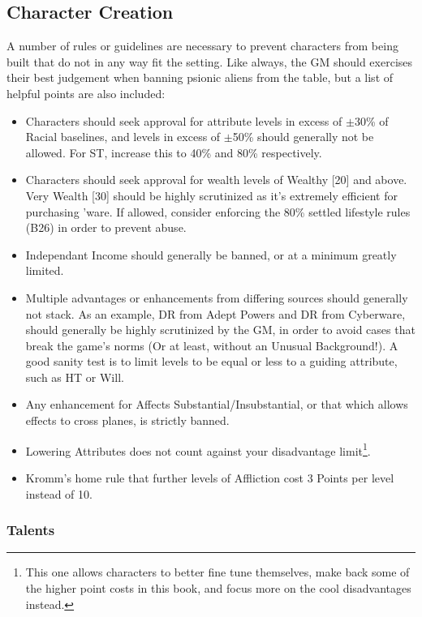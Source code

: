 \begin{multicols*}{3}
	\subsection{Character Creation}
	
	A number of rules or guidelines are necessary to prevent characters from being built that do not in any way fit the setting. Like always, the GM should exercises their best judgement when banning psionic aliens from the table, but a list of helpful points are also included:
	
	\begin{itemize}
		\itemsep 0pt
		\item Characters should seek approval for attribute levels in excess of \(\pm\)30\% of Racial baselines, and levels in excess of \(\pm\)50\% should generally not be allowed. For ST, increase this to 40\% and 80\% respectively.
		\item Characters should seek approval for wealth levels of Wealthy [20] and above. Very Wealth [30] should be highly scrutinized as it's extremely efficient for purchasing 'ware. If allowed, consider enforcing the 80\% settled lifestyle rules (B26) in order to prevent abuse.
		\item Independant Income should generally be banned, or at a minimum greatly limited.
		\item Multiple advantages or enhancements from differing sources should generally not stack. As an example, DR from Adept Powers and DR from Cyberware, should generally be highly scrutinized by the GM, in order to avoid cases that break the game's norms (Or at least, without an Unusual Background!). A good sanity test is to limit levels to be equal or less to a guiding attribute, such as HT or Will.
		\item Any enhancement for Affects Substantial/Insubstantial, or that which allows effects to cross planes, is strictly banned.
		\item Lowering Attributes does not count against your disadvantage limit\footnote{This one allows characters to better fine tune themselves, make back some of the higher point costs in this book, and focus more on the cool disadvantages instead.}.
		\item Kromm's home rule that further levels of Affliction cost 3 Points per level instead of 10.
	\end{itemize}
	
	\subsubsection{Talents}
	

\end{multicols*}

